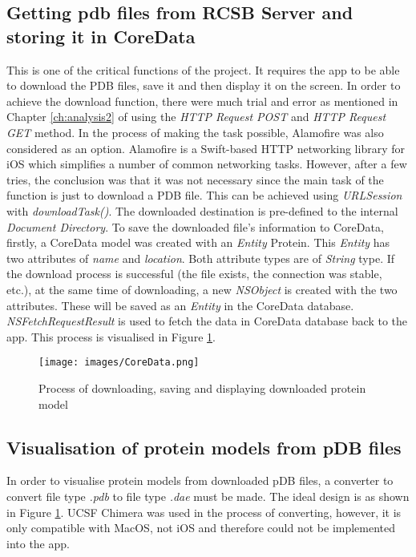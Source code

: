 \subsection{Getting pdb files from RCSB Server and storing it in CoreData}
This is one of the critical functions of the project. It requires the app to be able to download the PDB files, save it and then display it on the screen. 
In order to achieve the download function, there were much trial and error as mentioned in Chapter \ref{ch:analysis2} of using the \emph{HTTP Request POST} and \emph{HTTP Request GET} method. In the process of making the task possible, Alamofire was also considered as an option. Alamofire is a Swift-based HTTP networking library for iOS which simplifies a number of common networking tasks. However, after a few tries, the conclusion was that it was not necessary since the main task of the function is just to download a PDB file. This can be achieved using \emph{URLSession} with \emph{downloadTask()}. The downloaded destination is pre-defined to the internal \emph{Document Directory}. 
To save the downloaded file’s information to CoreData, firstly, a CoreData model was created with an \emph{Entity} Protein. This \emph{Entity} has two attributes of \emph{name} and \emph{location}. Both attribute types are of \emph{String} type. If the download process is successful (the file exists, the connection was stable, etc.), at the same time of downloading, a new \emph{NSObject} is created with the two attributes. These will be saved as an \emph{Entity} in the CoreData database. 
\emph{NSFetchRequestResult} is used to fetch the data in CoreData database back to the app. This process is visualised in Figure \ref{fig:coredata}.

\begin{figure}[!htp]
	\centering
	\texttt{[image: images/CoreData.png]}
	\caption{Process of downloading, saving and displaying downloaded protein model}
	\label{fig:coredata}
\end{figure}


\subsection{Visualisation of protein models from pDB files}
In order to visualise protein models from downloaded pDB files, a converter to convert file type \emph{.pdb} to file type \emph{.dae} must be made. The ideal design is as shown in Figure \ref{fig:coredata}. UCSF Chimera was used in the process of converting, however, it is only compatible with MacOS, not iOS and therefore could not be implemented into the app.

